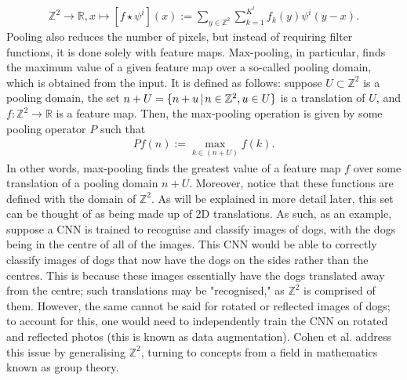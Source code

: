 \documentclass{article}
\begin{document}
    \begin{align*}
        \mathbb{Z}^2 \to \mathbb{R}, x \mapsto [f \star \psi^i](x) := \sum_{y \in \mathbb{Z}^2} \sum_{k = 1}^{K^l} f_k(y)\psi^i(y - x).
    \end{align*}
    Pooling also reduces the number of pixels, but instead of requiring filter functions, it is done solely with feature maps. Max-pooling, in particular, finds the maximum value of a given feature map over a so-called pooling domain, which is obtained from the input. It is defined as follows: suppose \(U \subset \mathbb{Z}^2\) is a pooling domain, the set \(n + U = \{n + u \hspace{0.5 mm}|\hspace{0.5 mm} n \in \mathbb{Z}^2, u \in U\}\) is a translation of \(U\), and \(f: \mathbb{Z}^2 \to \mathbb{R}\) is a feature map. Then, the max-pooling operation is given by some pooling operator \(P\) such that
    \begin{align*}
        Pf(n) := \max_{k \in (n + U)} f(k).
    \end{align*}
    In other words, max-pooling finds the greatest value of a feature map \(f\) over some translation of a pooling domain \(n + U\). Moreover, notice that these functions are defined with the domain of \(\mathbb{Z}^2\). As will be explained in more detail later, this set can be thought of as being made up of 2D translations. As such, as an example, suppose a CNN is trained to recognise and classify images of dogs, with the dogs being in the centre of all of the images. This CNN would be able to correctly classify images of dogs that now have the dogs on the sides rather than the centres. This is because these images essentially have the dogs translated away from the centre; such translations may be "recognised," as \(\mathbb{Z}^2\) is comprised of them. However, the same cannot be said for rotated or reflected images of dogs; to account for this, one would need to independently train the CNN on rotated and reflected photos (this is known as data augmentation). Cohen et al. address this issue by generalising \(\mathbb{Z}^2\), turning to concepts from a field in mathematics known as group theory.
\end{document}

